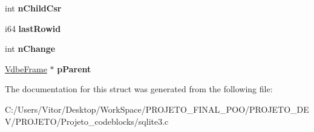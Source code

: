 \begin{DoxyCompactItemize}
\item 
\hypertarget{struct_vdbe_frame_a2d2900348092258d12eb71057812429a}{int {\bfseries n\-Child\-Csr}}\label{struct_vdbe_frame_a2d2900348092258d12eb71057812429a}

\item 
\hypertarget{struct_vdbe_frame_af655193217fb53c7acab9d24c94344aa}{i64 {\bfseries last\-Rowid}}\label{struct_vdbe_frame_af655193217fb53c7acab9d24c94344aa}

\item 
\hypertarget{struct_vdbe_frame_a77aacb67d627f4446dd50a795b5a2f0f}{int {\bfseries n\-Change}}\label{struct_vdbe_frame_a77aacb67d627f4446dd50a795b5a2f0f}

\item 
\hypertarget{struct_vdbe_frame_afb11d8aa920f34720333f52737375d59}{\hyperlink{struct_vdbe_frame}{Vdbe\-Frame} $\ast$ {\bfseries p\-Parent}}\label{struct_vdbe_frame_afb11d8aa920f34720333f52737375d59}

\end{DoxyCompactItemize}


The documentation for this struct was generated from the following file\-:\begin{DoxyCompactItemize}
\item 
C\-:/\-Users/\-Vitor/\-Desktop/\-Work\-Space/\-P\-R\-O\-J\-E\-T\-O\-\_\-\-F\-I\-N\-A\-L\-\_\-\-P\-O\-O/\-P\-R\-O\-J\-E\-T\-O\-\_\-\-D\-E\-V/\-P\-R\-O\-J\-E\-T\-O/\-Projeto\-\_\-codeblocks/sqlite3.\-c\end{DoxyCompactItemize}
